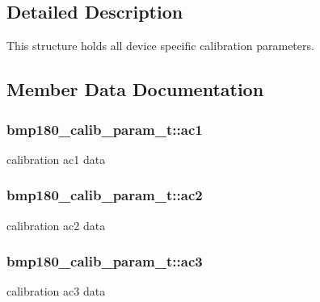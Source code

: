 \subsection{Detailed Description}
This structure holds all device specific calibration parameters. 

\subsection{Member Data Documentation}
\subsubsection[{\texorpdfstring{ac1}{ac1}}]{ bmp180\+\_\+calib\+\_\+param\+\_\+t\+::ac1}\hypertarget{structbmp180__calib__param__t_a4af824f7ed92cef41c2e591aff2ed3ba}{}\label{structbmp180__calib__param__t_a4af824f7ed92cef41c2e591aff2ed3ba}
calibration ac1 data 
\subsubsection[{\texorpdfstring{ac2}{ac2}}]{ bmp180\+\_\+calib\+\_\+param\+\_\+t\+::ac2}\hypertarget{structbmp180__calib__param__t_abe5534331e8ea703b759484322101e89}{}\label{structbmp180__calib__param__t_abe5534331e8ea703b759484322101e89}
calibration ac2 data 
\subsubsection[{\texorpdfstring{ac3}{ac3}}]{ bmp180\+\_\+calib\+\_\+param\+\_\+t\+::ac3}\hypertarget{structbmp180__calib__param__t_ac5563e3a7ecbf6f0a991e04d87d01dd8}{}\label{structbmp180__calib__param__t_ac5563e3a7ecbf6f0a991e04d87d01dd8}
calibration ac3 data 
